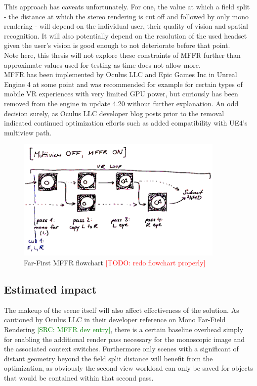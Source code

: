 This approach has caveats unfortunately. For one, the value at which a field split - the distance at which the stereo rendering is cut off and followed by only mono rendering - will depend on the individual user, their quality of vision and spatial recognition. It will also potentially depend on the resolution of the used headset given the user's vision is good enough to not deteriorate before that point. \\
Note here, this thesis will not explore these constraints of MFFR further than approximate values used for testing as time does not allow more. \\
MFFR has been implemented by Oculus LLC and Epic Games Inc in Unreal Engine 4 at some point and was recommended for example for certain types of mobile VR experiences with very limited GPU power, but curiously has been removed from the engine in update 4.20 without further explanation. An odd decision surely, as Oculus LLC developer blog posts prior to the removal indicated continued optimization efforts such as added compatibility with UE4's multiview path. 

\begin{figure}[htb]
  \centering
  \includegraphics[width=0.9\textwidth]{pictures/flowchart_mffr}
  \caption{Far-First MFFR flowchart \textcolor{red}{[TODO: redo flowchart properly]}} \label{fig:flowchart_mffr_FarFirst}
\end{figure}

\subsection{Estimated impact}
The makeup of the scene itself will also affect effectiveness of the solution. As cautioned by Oculus LLC in their developer reference on Mono Far-Field Rendering \textcolor{green}{[SRC: MFFR dev entry]}, there is a certain baseline overhead simply for enabling the additional render pass necessary for the monoscopic image and the associated context switches. Furthermore only scenes with a significant of distant geometry beyond the field split distance will benefit from the optimization, as obviously the second view workload can only be saved for objects that would be contained within that second pass. \\

